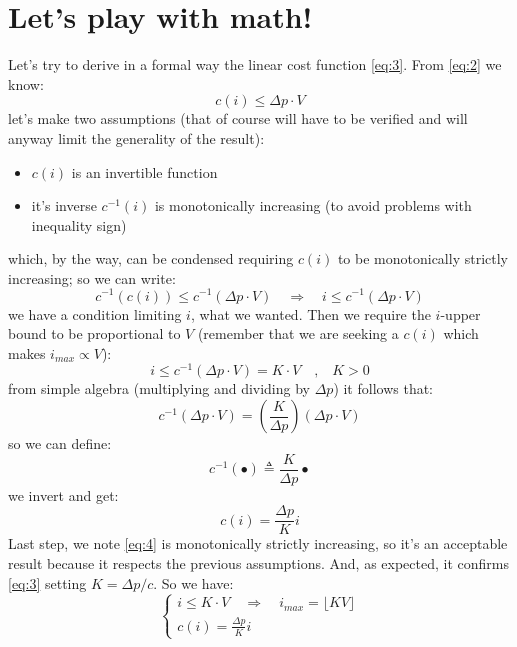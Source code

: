 \documentclass[10pt,a4paper]{article}
\begin{document}
	\section{Let’s play with math!}
	Let’s try to derive in a formal way the linear cost function \ref{eq:3}. From \ref{eq:2} we know:
	\begin{equation*}
		c(i) \leq \Delta p \cdot V
	\end{equation*}
	let’s make two assumptions (that of course will have to be verified and will anyway limit the generality of the result):
	\begin{itemize}
		\item $c(i)$ is an invertible function
		\item it's inverse $c^{-1}(i)$ is monotonically increasing (to avoid problems with inequality sign)
	\end{itemize}
	which, by the way, can be condensed requiring $c(i)$ to be monotonically strictly increasing; so we can write:
	\begin{equation*}
		c^{-1}(c(i)) \leq c^{-1}(\Delta p\cdot V) \quad \Longrightarrow \quad i \leq c^{-1}(\Delta p\cdot V)
	\end{equation*}
	we have a condition limiting $i$, what we wanted. Then we require the $i$-upper bound to be proportional to $V$ (remember that we are seeking a $c(i)$ which makes $i_{max} \propto V$):
	\begin{equation*}
		i \leq c^{-1}(\Delta p\cdot V) = K \cdot V \quad \textrm{,} \quad K>0
	\end{equation*}
	from simple algebra (multiplying and dividing by $\Delta p$) it follows that:
	\begin{equation*}
		c^{-1}(\Delta p\cdot V) = \left(\frac{K}{\Delta p}\right) (\Delta p\cdot V)
	\end{equation*}	
	so we can define:
	\begin{equation*}
		c^{-1}(\bullet) \triangleq \frac{K}{\Delta p}\bullet
	\end{equation*}		
	we invert and get:
	\begin{equation}\label{eq:4}
		c(i)=\frac{\Delta p}{K}i
	\end{equation}
	Last step, we note \ref{eq:4} is monotonically strictly increasing, so it’s an acceptable result because it respects the previous assumptions. And, as expected, it confirms \ref{eq:3} setting $K= \Delta p/c$. So we have:
	\begin{equation}\label{eq:5}	
		\begin{cases}
			i \leq K \cdot V \quad \Longrightarrow \quad i_{max} = \lfloor KV \rfloor\\
			c(i) = \displaystyle\frac{\Delta p}{K}i 
		\end{cases}
	\end{equation}
\end{document}
